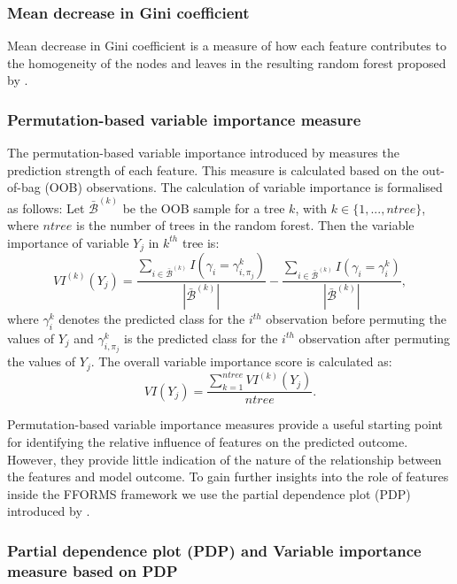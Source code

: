 \documentclass[11pt,a4paper,]{article}
\begin{document}
\hypertarget{mean-decrease-in-gini-coefficient}{%
\subsubsection{Mean decrease in Gini coefficient}\label{mean-decrease-in-gini-coefficient}}

Mean decrease in Gini coefficient is a measure of how each feature contributes to the homogeneity of the nodes and leaves in the resulting random forest proposed by \textcite{breiman2001random}.

\hypertarget{permutation-based-variable-importance-measure}{%
\subsubsection{Permutation-based variable importance measure}\label{permutation-based-variable-importance-measure}}

The permutation-based variable importance introduced by \textcite{breiman2001random} measures the prediction
strength of each feature. This measure is calculated based on the out-of-bag (OOB) observations. The calculation of variable importance is formalised as follows: Let \(\bar{\mathcal{B}}^{(k)}\) be the OOB sample for a tree \(k\), with \(k\in \{1,...,ntree\}\), where \(ntree\) is the number of trees in the random forest. Then the variable importance of variable \(Y_{j}\) in \(k^{th}\) tree is:
\[VI^{(k)}(Y_{j})=\frac{\sum_{i\in \bar{\mathcal{B}}^{(k)}}I(\gamma_{i}=\gamma_{i,\pi_{j}}^{k})}{|\bar{\mathcal{B}}^{(k)}|}-\frac{\sum_{i\in \bar{\mathcal{B}}^{(k)}}I(\gamma_{i}=\gamma_{i}^{k})}{|\bar{\mathcal{B}}^{(k)}|},\]
where \(\gamma_{i}^{k}\) denotes the predicted class for the \(i^{th}\) observation before permuting the values of \(Y_{j}\) and \(\gamma_{i, \pi_{j}}^{k}\) is the predicted class for the \(i^{th}\) observation after permuting the values of \(Y_{j}\). The overall variable importance score is calculated as:
\[VI(Y_{j})=\frac{\sum_{k=1}^{ntree}VI^{(k)}(Y_{j})}{ntree}.\]

Permutation-based variable importance measures provide a useful starting point for identifying the relative influence of features on the predicted outcome. However, they provide little indication of the nature of the relationship between the features and model outcome. To gain further insights into the role of features inside the FFORMS framework we use the partial dependence plot (PDP) introduced by \textcite{friedman2008predictive}.

\hypertarget{partial-dependence-plot-pdp-and-variable-importance-measure-based-on-pdp}{%
\subsubsection{Partial dependence plot (PDP) and Variable importance measure based on PDP}\label{partial-dependence-plot-pdp-and-variable-importance-measure-based-on-pdp}}
\end{document}
